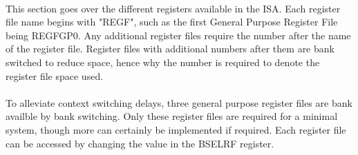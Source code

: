 \documentclass[letterpaper, 11pt]{article}
\begin{document}
\paragraph{}This section goes over the different registers available in the ISA. Each register file name begins with 
"REGF", such as the first General Purpose Register File being REGFGP0. Any additional register files require the number after the
name of the register file. Register files with additional numbers after them are bank switched to reduce space, hence why the number is
required to denote the register file space used.
\paragraph{}To alleviate context switching delays, three general purpose register files are bank availble by bank switching. Only these register files are required
for a minimal system, though more can certainly be implemented if required. Each register file can be accessed by changing the value in the BSELRF register. 
\end{document}
